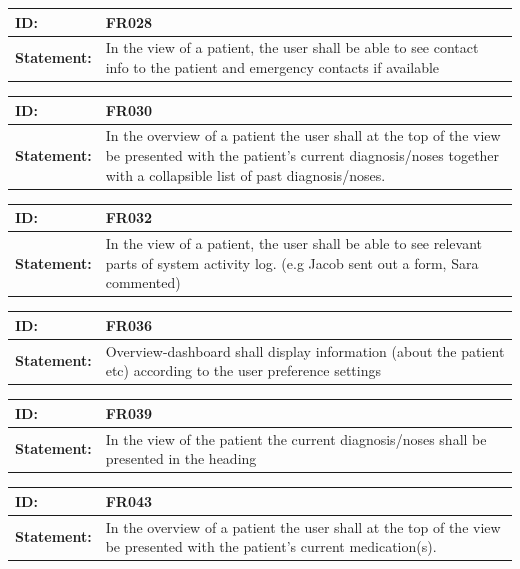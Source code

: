 \documentclass{scrreprt}
\begin{document}
\begin{center}
\begin{tabularx}{\linewidth}{| l | X |}
 \hline
 \textbf{ID:} & FR028  \\ 
 \hline
 \textbf{Statement:} & In the view of a patient, the user shall be able to see contact info to the patient and emergency contacts if available
 \\ 
 \hline
\end{tabularx}

\begin{tabularx}{\linewidth}{| l | X |}
 \hline
 \textbf{ID:} & FR030  \\ 
 \hline
 \textbf{Statement:} & In the overview of a patient the user shall at the top of the view be presented with the patient’s current diagnosis/noses together with a collapsible list of past diagnosis/noses.
 \\ 
 \hline
\end{tabularx}

\begin{tabularx}{\linewidth}{| l | X |}
 \hline
 \textbf{ID:} & FR032  \\ 
 \hline
 \textbf{Statement:} & In the view of a patient, the user shall be able to see relevant parts of system activity log. (e.g Jacob sent out a form, Sara commented)
 \\ 
 \hline
\end{tabularx}

\begin{tabularx}{\linewidth}{| l | X |}
 \hline
 \textbf{ID:} & FR036  \\ 
 \hline
 \textbf{Statement:} & Overview-dashboard shall display information (about the patient etc) according to the user preference settings
 \\ 
 \hline
\end{tabularx}


\begin{tabularx}{\linewidth}{| l | X |}
 \hline
 \textbf{ID:} & FR039  \\ 
 \hline
 \textbf{Statement:} & In the view of the patient the current diagnosis/noses shall be presented in the heading 
 \\ 
 \hline
\end{tabularx}

\begin{tabularx}{\linewidth}{| l | X |}
 \hline
 \textbf{ID:} & FR043  \\ 
 \hline
 \textbf{Statement:} & In the overview of a patient the user shall at the top of the view be presented with the patient’s current medication(s).
 \\ 
 \hline
\end{tabularx}


\end{center}
\end{document}
